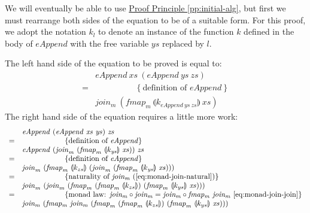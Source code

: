 \documentclass{jfp1}
\newcommand{\fold}[1]{\llparenthesis #1 \rrparenthesis}
\newcommand{\eqAnnotation}[1]{\hspace{2cm}\left\{\textrm{#1}\right\}}
\newcommand{\proofprinref}[1]{\hyperref[#1]{Proof Principle \ref*{#1}}}
\begin{document}
\begin{proof*}
  We will eventually be able to use \proofprinref{pp:initial-alg}, but
  first we must rearrange both sides of the equation to be of a
  suitable form. For this proof, we adopt the notation $k_l$ to denote
  an instance of the function $k$ defined in the body of
  $\mathit{eAppend}$ with the free variable $\mathit{ys}$ replaced by
  $l$.

  The left hand side of the equation to be proved is equal to:
  \begin{displaymath}
    \begin{array}{cl}
       &\mathit{eAppend}~\mathit{xs}~(\mathit{eAppend}~\mathit{ys}~\mathit{zs})
      \\ =&\eqAnnotation{definition of $\mathit{eAppend}$}
      \\ &\mathit{join_m}~(\mathit{fmap_m}~\fold{k_{\mathit{eAppend}~\mathit{ys}~\mathit{zs}}}~\mathit{xs})
    \end{array}
  \end{displaymath}
  The right hand side of the equation requires a little more work:
  \begin{displaymath}
    \begin{array}{cl}
      &\mathit{eAppend}~(\mathit{eAppend}~\mathit{xs}~\mathit{ys})~\mathit{zs}
      \\ =&\eqAnnotation{definition of $\mathit{eAppend}$}
      \\ &\mathit{eAppend}~(\mathit{join}_m~(\mathit{fmap}_m~\fold{k_{\mathit{ys}}}~\mathit{xs}))~\mathit{zs}
      \\ =&\eqAnnotation{definition of $\mathit{eAppend}$}
      \\ &\mathit{join}_m~(\mathit{fmap}_m~\fold{k_{zs}}~(\mathit{join}_m~(\mathit{fmap}_m~\fold{k_{\mathit{ys}}}~\mathit{xs})))
      \\ =&\eqAnnotation{naturality of $\mathit{join_m}$
        (\autoref{eq:monad-join-natural})}
      \\ &\mathit{join}_m~(\mathit{join}_m~(\mathit{fmap}_m~(\mathit{fmap}_m~\fold{k_{zs}})~(\mathit{fmap}_m~\fold{k_{ys}}~\mathit{xs})))
      \\ =&\eqAnnotation{monad law:
$\mathit{join_m} \circ \mathit{join_m} = \mathit{join_m} \circ \mathit{fmap_m}~\mathit{join_m}$ 
\autoref{eq:monad-join-join}} \\
      &\mathit{join_m}~(\mathit{fmap_m}~\mathit{join_m}~(\mathit{fmap}_m~(\mathit{fmap}_m~\fold{k_{zs}})~(\mathit{fmap}_m~\fold{k_{ys}}~\mathit{xs}))) \\

\end{array}
\end{displaymath}
\end{proof*}
\end{document}
